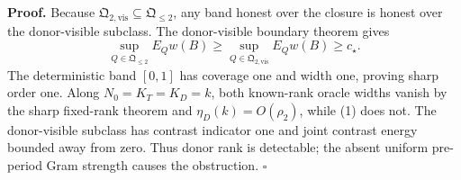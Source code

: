 \textbf{Proof.}
Because \(\mathfrak Q_{2,\mathrm{vis}}\subseteq\mathfrak Q_{\le2}\), any band honest over the closure is honest over the donor-visible subclass. The donor-visible boundary theorem gives
\[
 \sup_{Q\in\mathfrak Q_{\le2}}E_Qw(B)
 \ge\sup_{Q\in\mathfrak Q_{2,\mathrm{vis}}}E_Qw(B)\ge c_\star. \tag{1}
\]
The deterministic band \([0,1]\) has coverage one and width one, proving sharp order one. Along \(N_0=K_T=K_D=k\), both known-rank oracle widths vanish by the sharp fixed-rank theorem and \(\eta_D(k)=O(\rho_2)\), while (1) does not. The donor-visible subclass has contrast indicator one and joint contrast energy bounded away from zero. Thus donor rank is detectable; the absent uniform pre-period Gram strength causes the obstruction. \(\square\)